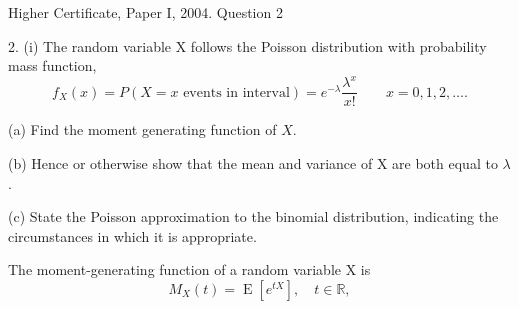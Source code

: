 \documentclass[a4paper,12pt]{article}
\begin{document}
Higher Certificate, Paper I, 2004. Question 2

\begin{framed}
2. (i) The random variable X follows the Poisson distribution with probability mass function,    
\[ {\displaystyle f_X(x) =  P(X = x{\text{ events in interval}})=e^{-\lambda }{\frac {\lambda ^{x}}{x!}}} \qquad x = 0, 1, 2, \ldots .  \]


(a) Find the moment generating function of $X$. 
 
(b) Hence or otherwise show that the mean and variance of X are both equal to $\lambda$ . 
 
(c) State the Poisson approximation to the binomial distribution, indicating the circumstances in which it is appropriate.  
 
\end{framed}

The moment-generating function of a random variable X is 
\[{\displaystyle M_{X}(t) =\operatorname {E} \left[e^{tX}\right],\quad t\in \mathbb {R} ,} \]
\end{document}
